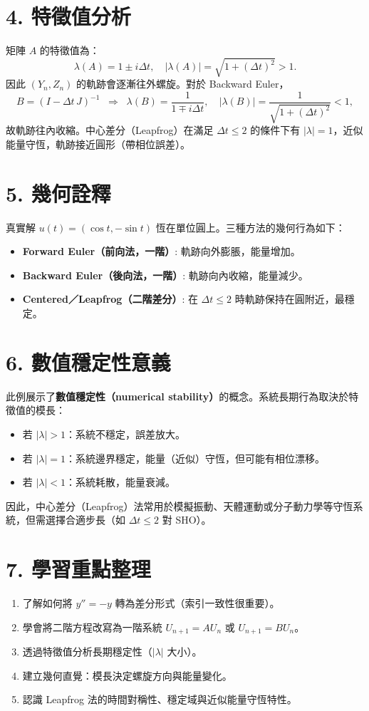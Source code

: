 \documentclass[a4paper,12pt]{article}
\begin{document}
\section*{4. 特徵值分析}
矩陣 $A$ 的特徵值為：
\[
\lambda(A) = 1 \pm i\Delta t, \quad |\lambda(A)| = \sqrt{1 + (\Delta t)^2} > 1.
\]
因此 $(Y_n, Z_n)$ 的軌跡會逐漸往外螺旋。對於 Backward Euler，
\[
B = (I - \Delta t\, J)^{-1} \;\;\Rightarrow\;\; \lambda(B) = \frac{1}{1 \mp i\Delta t}, \quad |\lambda(B)| = \frac{1}{\sqrt{1+(\Delta t)^2}} < 1,
\]
故軌跡往內收縮。中心差分（Leapfrog）在滿足 $\Delta t \le 2$ 的條件下有 $|\lambda|=1$，近似能量守恆，軌跡接近圓形（帶相位誤差）。


\section*{5. 幾何詮釋}
真實解 $u(t) = (\cos t, -\sin t)$ 恆在單位圓上。三種方法的幾何行為如下：
\begin{itemize}
\item \textbf{Forward Euler（前向法，一階）}: 軌跡向外膨脹，能量增加。
\item \textbf{Backward Euler（後向法，一階）}: 軌跡向內收縮，能量減少。
\item \textbf{Centered／Leapfrog（二階差分）}: 在 $\Delta t \le 2$ 時軌跡保持在圓附近，最穩定。
\end{itemize}


\section*{6. 數值穩定性意義}
此例展示了\textbf{數值穩定性（numerical stability）}的概念。系統長期行為取決於特徵值的模長：
\begin{itemize}
\item 若 $|\lambda|>1$：系統不穩定，誤差放大。
\item 若 $|\lambda|=1$：系統邊界穩定，能量（近似）守恆，但可能有相位漂移。
\item 若 $|\lambda|<1$：系統耗散，能量衰減。
\end{itemize}
因此，中心差分（Leapfrog）法常用於模擬振動、天體運動或分子動力學等守恆系統，但需選擇合適步長（如 $\Delta t \le 2$ 對 SHO）。


\section*{7. 學習重點整理}
\begin{enumerate}
\item 了解如何將 $y''=-y$ 轉為差分形式（索引一致性很重要）。
\item 學會將二階方程改寫為一階系統 $U_{n+1}=AU_n$ 或 $U_{n+1}=BU_n$。
\item 透過特徵值分析長期穩定性（\(|\lambda|\) 大小）。
\item 建立幾何直覺：模長決定螺旋方向與能量變化。
\item 認識 Leapfrog 法的時間對稱性、穩定域與近似能量守恆特性。
\end{enumerate}
\end{document}
